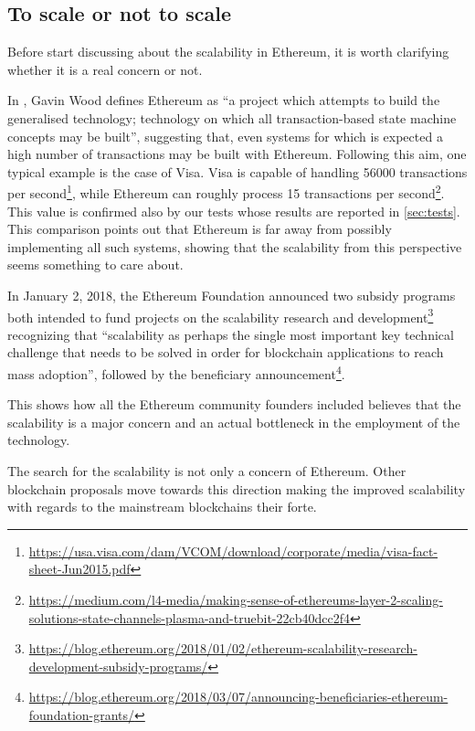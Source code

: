 \subsection{To scale or not to scale}

Before start discussing about the scalability in Ethereum, it is worth
clarifying whether it is a real concern or not.

In \cite{wood2018ethereum}, Gavin Wood defines Ethereum as ``a project which
attempts to build the generalised technology; technology on which all
transaction-based state machine concepts may be built'', suggesting that, even
systems for which is expected a high number of transactions may be built with
Ethereum. Following this aim, one typical example is the case of Visa. Visa is
capable of handling 56000 transactions per
second\footnote{\url{https://usa.visa.com/dam/VCOM/download/corporate/media/visa-fact-sheet-Jun2015.pdf}},
while Ethereum can roughly process 15 transactions per
second\footnote{\url{https://medium.com/l4-media/making-sense-of-ethereums-layer-2-scaling-solutions-state-channels-plasma-and-truebit-22cb40dcc2f4}}.
This value is confirmed also by our tests whose results are reported in
\autoref{sec:tests}. This comparison points out that Ethereum is far away from
possibly implementing all such systems, showing that the scalability from this
perspective seems something to care about.

In January 2, 2018, the Ethereum Foundation announced two subsidy programs both
intended to fund projects on the scalability research and
development\footnote{\url{https://blog.ethereum.org/2018/01/02/ethereum-scalability-research-development-subsidy-programs/}}
recognizing that ``scalability as perhaps the single most important key
technical challenge that needs to be solved in order for blockchain applications
to reach mass adoption'', followed by the beneficiary
announcement\footnote{\url{https://blog.ethereum.org/2018/03/07/announcing-beneficiaries-ethereum-foundation-grants/}}.

This shows how all the Ethereum community founders included believes that the
scalability is a major concern and an actual bottleneck in the employment of the
technology.

The search for the scalability is not only a concern of Ethereum. Other
blockchain proposals move towards this direction making the improved scalability
with regards to the mainstream blockchains their forte.
